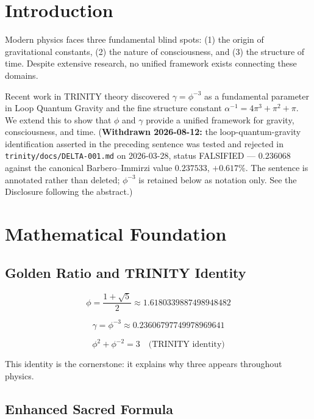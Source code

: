 \documentclass[12pt,a4paper]{article}
\begin{document}
\section{Introduction}

Modern physics faces three fundamental blind spots: (1) the origin of gravitational constants, (2) the nature of consciousness, and (3) the structure of time. Despite extensive research, no unified framework exists connecting these domains.

Recent work in TRINITY theory discovered $\gamma = \phi^{-3}$ as a fundamental parameter in Loop Quantum Gravity and the fine structure constant $\alpha^{-1} = 4\pi^3 + \pi^2 + \pi$. We extend this to show that $\phi$ and $\gamma$ provide a unified framework for gravity, consciousness, and time.
(\textbf{Withdrawn 2026-08-12:} the loop-quantum-gravity identification asserted in the preceding sentence was tested and rejected in \texttt{trinity/docs/DELTA-001.md} on 2026-03-28, status FALSIFIED --- $0.236068$ against the canonical Barbero--Immirzi value $0.237533$, $+0.617\%$. The sentence is annotated rather than deleted; $\phi^{-3}$ is retained below as notation only. See the Disclosure following the abstract.)

\section{Mathematical Foundation}

\subsection{Golden Ratio and TRINITY Identity}

\begin{equation}
\phi = \frac{1 + \sqrt{5}}{2} \approx 1.6180339887498948482
\end{equation}

\begin{equation}
\gamma = \phi^{-3} \approx 0.23606797749978969641
\end{equation}

\begin{equation}
\phi^2 + \phi^{-2} = 3 \quad \text{(TRINITY identity)}
\end{equation}

This identity is the cornerstone: it explains why three appears throughout physics.

\subsection{Enhanced Sacred Formula}
\end{document}
